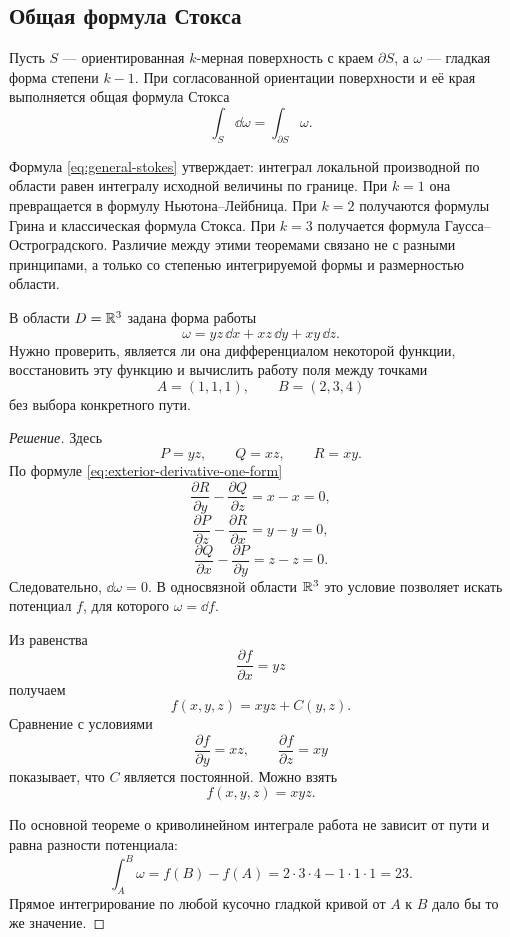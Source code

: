 \subsection{Общая формула Стокса}

Пусть \(S\) --- ориентированная \(k\)-мерная поверхность с краем \(\partial S\), а \(\omega\) --- гладкая форма степени \(k-1\). При согласованной ориентации поверхности и её края выполняется общая формула Стокса
\begin{equation}
\label{eq:general-stokes}
\int_S \dd\omega
=
\int_{\partial S}\omega.
\end{equation}

Формула \eqref{eq:general-stokes} утверждает: интеграл локальной производной по области равен интегралу исходной величины по границе. При \(k=1\) она превращается в формулу Ньютона--Лейбница. При \(k=2\) получаются формулы Грина и классическая формула Стокса. При \(k=3\) получается формула Гаусса--Остроградского. Различие между этими теоремами связано не с разными принципами, а только со степенью интегрируемой формы и размерностью области.

\begin{problem}
В области \(D=\mathbb{R}^3\) задана форма работы
\[
\omega
=yz\,\dd x+xz\,\dd y+xy\,\dd z.
\]
Нужно проверить, является ли она дифференциалом некоторой функции, восстановить эту функцию и вычислить работу поля между точками
\[
A=(1,1,1),
\qquad
B=(2,3,4)
\]
без выбора конкретного пути.
\end{problem}

\begin{proof}[Решение]
Здесь
\[
P=yz,
\qquad
Q=xz,
\qquad
R=xy.
\]
По формуле \eqref{eq:exterior-derivative-one-form}
\[
\frac{\partial R}{\partial y}
-
\frac{\partial Q}{\partial z}
=x-x=0,
\]
\[
\frac{\partial P}{\partial z}
-
\frac{\partial R}{\partial x}
=y-y=0,
\]
\[
\frac{\partial Q}{\partial x}
-
\frac{\partial P}{\partial y}
=z-z=0.
\]
Следовательно, \(\dd\omega=0\). В односвязной области \(\mathbb{R}^3\) это условие позволяет искать потенциал \(f\), для которого \(\omega=\dd f\).

Из равенства
\[
\frac{\partial f}{\partial x}=yz
\]
получаем
\[
f(x,y,z)=xyz+C(y,z).
\]
Сравнение с условиями
\[
\frac{\partial f}{\partial y}=xz,
\qquad
\frac{\partial f}{\partial z}=xy
\]
показывает, что \(C\) является постоянной. Можно взять
\[
f(x,y,z)=xyz.
\]

По основной теореме о криволинейном интеграле работа не зависит от пути и равна разности потенциала:
\[
\int_A^B\omega
=f(B)-f(A)
=2\cdot3\cdot4-1\cdot1\cdot1
=23.
\]
Прямое интегрирование по любой кусочно гладкой кривой от \(A\) к \(B\) дало бы то же значение.
\end{proof}

